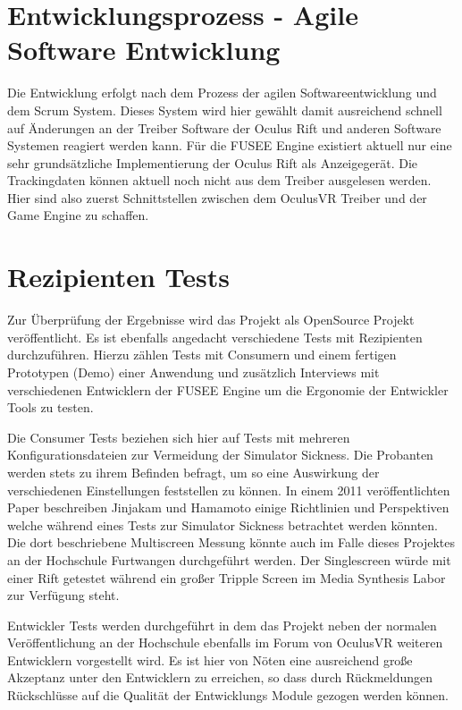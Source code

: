 \documentclass[pagesize, paper=a4, fontsize=12pt,titlepage=true, headings=small, headnosepline, abstractoff, liststotoc, nochapterprefix, plainheadsepline]{scrreprt}
\begin{document}
\section{Entwicklungsprozess - Agile Software Entwicklung}
Die Entwicklung erfolgt nach dem Prozess der agilen Softwareentwicklung und dem Scrum System. Dieses System wird hier gewählt damit ausreichend schnell auf Änderungen an der Treiber Software der Oculus Rift und anderen Software Systemen reagiert werden kann. Für die FUSEE Engine existiert aktuell nur eine sehr grundsätzliche Implementierung der Oculus Rift als Anzeigegerät. Die Trackingdaten können aktuell noch nicht aus dem Treiber ausgelesen werden. Hier sind also zuerst Schnittstellen zwischen dem OculusVR Treiber und der Game Engine zu schaffen. 

\section{Rezipienten Tests}
Zur Überprüfung der Ergebnisse wird das Projekt als OpenSource Projekt veröffentlicht. Es ist ebenfalls angedacht verschiedene Tests mit Rezipienten durchzuführen. Hierzu zählen Tests mit Consumern und einem fertigen Prototypen (Demo) einer Anwendung und zusätzlich Interviews mit verschiedenen Entwicklern der FUSEE Engine um die Ergonomie der Entwickler Tools zu testen.

Die Consumer Tests beziehen sich hier auf Tests mit mehreren Konfigurationsdateien zur Vermeidung der Simulator Sickness. Die Probanten werden stets zu ihrem Befinden befragt, um so eine Auswirkung der verschiedenen Einstellungen feststellen zu können. In einem 2011 veröffentlichten Paper beschreiben Jinjakam und Hamamoto \cite{JinjakamHamamoto2011} einige Richtlinien und Perspektiven welche während eines Tests zur Simulator Sickness betrachtet werden könnten. Die dort beschriebene Multiscreen Messung könnte auch im Falle dieses Projektes an der Hochschule Furtwangen durchgeführt werden. Der Singlescreen würde mit einer Rift getestet während ein großer Tripple Screen im Media Synthesis Labor zur Verfügung steht.

Entwickler Tests werden durchgeführt in dem das Projekt neben der normalen Veröffentlichung an der Hochschule ebenfalls im Forum von OculusVR weiteren Entwicklern vorgestellt wird. Es ist hier von Nöten eine ausreichend große Akzeptanz unter den Entwicklern zu erreichen, so dass durch Rückmeldungen Rückschlüsse auf die Qualität der Entwicklungs Module gezogen werden können. 
\end{document}
